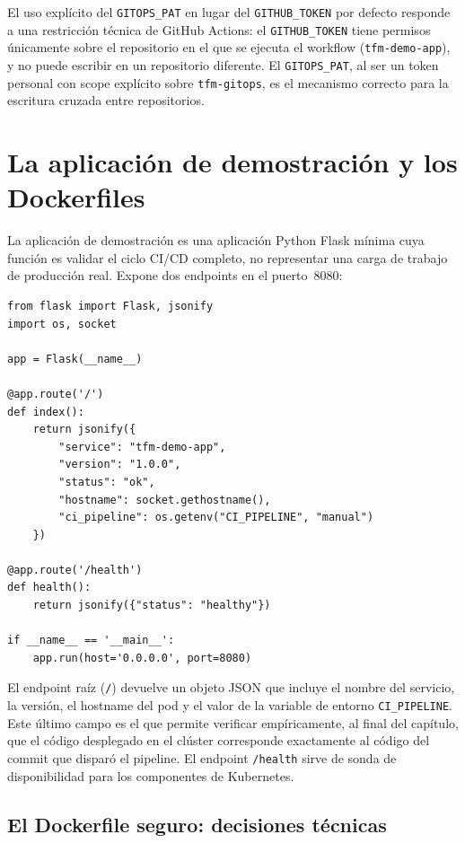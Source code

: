 El uso explícito del \texttt{GITOPS\_PAT} en lugar del \texttt{GITHUB\_TOKEN} por defecto responde a una restricción técnica de GitHub Actions: el \texttt{GITHUB\_TOKEN} tiene permisos únicamente sobre el repositorio en el que se ejecuta el workflow (\texttt{tfm-demo-app}), y no puede escribir en un repositorio diferente. El \texttt{GITOPS\_PAT}, al ser un token personal con scope explícito sobre \texttt{tfm-gitops}, es el mecanismo correcto para la escritura cruzada entre repositorios.

\section{La aplicación de demostración y los Dockerfiles}

La aplicación de demostración es una aplicación Python Flask mínima cuya función es validar el ciclo CI/CD completo, no representar una carga de trabajo de producción real. Expone dos endpoints en el puerto~8080:

\begin{lstlisting}
from flask import Flask, jsonify
import os, socket

app = Flask(__name__)

@app.route('/')
def index():
    return jsonify({
        "service": "tfm-demo-app",
        "version": "1.0.0",
        "status": "ok",
        "hostname": socket.gethostname(),
        "ci_pipeline": os.getenv("CI_PIPELINE", "manual")
    })

@app.route('/health')
def health():
    return jsonify({"status": "healthy"})

if __name__ == '__main__':
    app.run(host='0.0.0.0', port=8080)
\end{lstlisting}

El endpoint raíz (\texttt{/}) devuelve un objeto JSON que incluye el nombre del servicio, la versión, el hostname del pod y el valor de la variable de entorno \texttt{CI\_PIPELINE}. Este último campo es el que permite verificar empíricamente, al final del capítulo, que el código desplegado en el clúster corresponde exactamente al código del commit que disparó el pipeline. El endpoint \texttt{/health} sirve de sonda de disponibilidad para los componentes de Kubernetes.

\subsection{El Dockerfile seguro: decisiones técnicas}

